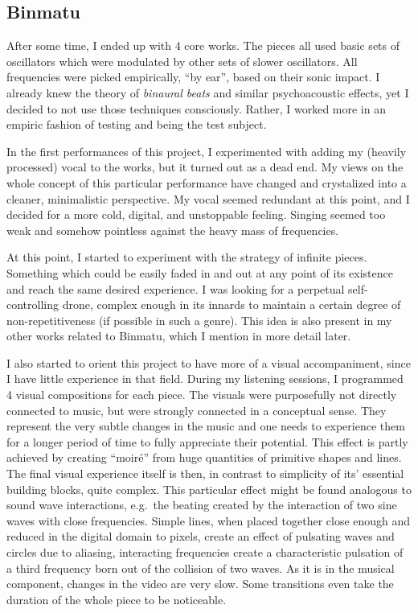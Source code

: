 \documentclass[12pt,a4paper,oneside]{report}
\begin{document}
\subsection{Binmatu}

After some time, I ended up with 4 core works. The pieces all used basic sets of oscillators which were modulated by other sets of slower oscillators. All frequencies were picked empirically, ``by ear'', based on their sonic impact. I already knew the theory of \emph{binaural beats} and similar psychoacoustic effects, yet I decided to not use those techniques consciously. Rather, I worked more in an empiric fashion of testing and being the test subject.

In the first performances of this project, I experimented with adding my (heavily processed) vocal to the works, but it turned out as a dead end. My views on the whole concept of this particular performance have changed and crystalized into a cleaner, minimalistic perspective. My vocal seemed redundant at this point, and I decided for a more cold, digital, and unstoppable feeling. Singing seemed too weak and somehow pointless against the heavy mass of frequencies. 

At this point, I started to experiment with the strategy of infinite pieces. Something which could be easily faded in and out at any point of its existence and reach the same desired experience. I was looking for a perpetual self-controlling drone, complex enough in its innards to maintain a certain degree of non-repetitiveness (if possible in such a genre). This idea is also present in my other works related to Binmatu, which I mention in more detail later. 

I also started to orient this project to have more of a visual accompaniment, since I have little experience in that field. During my listening sessions, I programmed 4 visual compositions for each piece. The visuals were purposefully not directly connected to music, but were strongly connected in a conceptual sense. They represent the very subtle changes in the music and one needs to experience them for a longer period of time to fully appreciate their potential. This effect is partly achieved by creating ``moiré'' from huge quantities of primitive shapes and lines. The final visual experience itself is then, in contrast to simplicity of its' essential building blocks, quite complex. This particular effect might be found analogous to sound wave interactions, e.g.\ the beating created by the interaction of two sine waves with close frequencies. Simple lines, when placed together close enough and reduced in the digital domain to pixels, create an effect of pulsating waves and circles due to aliasing, interacting frequencies create a characteristic pulsation of a third frequency born out of the collision of two waves. As it is in the musical component, changes in the video are very slow. Some transitions even take the duration of the whole piece to be noticeable.
\end{document}

